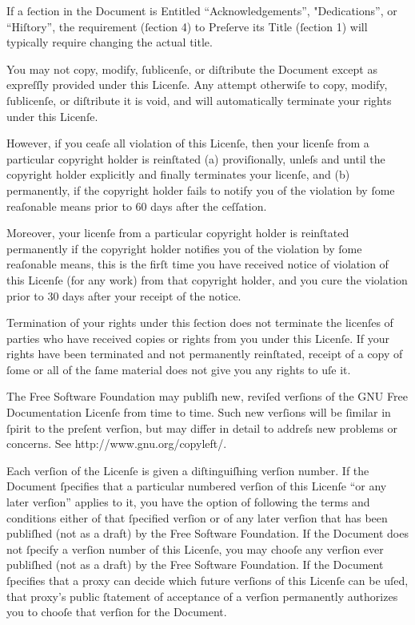 If a ſection in the Document is Entitled “Acknowledgements”, 
"Dedications”, or “Hiſtory”, the requirement (ſection 4) to Preſerve its 
Title (ſection 1) will typically require changing the actual title.



You may not copy, modify, ſublicenſe, or diſtribute the Document except 
as expreſſly provided under this Licenſe. Any attempt otherwiſe to copy, 
modify, ſublicenſe, or diſtribute it is void, and will automatically 
terminate your rights under this Licenſe.

However, if you ceaſe all violation of this Licenſe, then your licenſe 
from a particular copyright holder is reinſtated (a) proviſionally, 
unleſs and until the copyright holder explicitly and finally terminates 
your licenſe, and (b) permanently, if the copyright holder fails to 
notify you of the violation by ſome reaſonable means prior to 60 days 
after the ceſſation.

Moreover, your licenſe from a particular copyright holder is reinſtated 
permanently if the copyright holder notifies you of the violation by 
ſome reaſonable means, this is the firſt time you have received notice 
of violation of this Licenſe (for any work) from that copyright holder, 
and you cure the violation prior to 30 days after your receipt of the 
notice.

Termination of your rights under this ſection does not terminate the 
licenſes of parties who have received copies or rights from you under 
this Licenſe. If your rights have been terminated and not permanently 
reinſtated, receipt of a copy of ſome or all of the ſame material does 
not give you any rights to uſe it.



The Free Software Foundation may publiſh new, reviſed verſions of the 
GNU Free Documentation Licenſe from time to time. Such new verſions will 
be ſimilar in ſpirit to the preſent verſion, but may differ in detail to 
addreſs new problems or concerns. See http://www.gnu.org/copyleft/.

Each verſion of the Licenſe is given a diſtinguiſhing verſion number. If 
the Document ſpecifies that a particular numbered verſion of this 
Licenſe “or any later verſion” applies to it, you have the option of 
following the terms and conditions either of that ſpecified verſion or 
of any later verſion that has been publiſhed (not as a draft) by the 
Free Software Foundation. If the Document does not ſpecify a verſion 
number of this Licenſe, you may chooſe any verſion ever publiſhed (not 
as a draft) by the Free Software Foundation. If the Document ſpecifies 
that a proxy can decide which future verſions of this Licenſe can be 
uſed, that proxy’s public ſtatement of acceptance of a verſion 
permanently authorizes you to chooſe that verſion for the Document.

